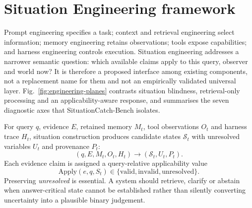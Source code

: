 \section*{Situation Engineering framework}

Prompt engineering specifies a task; context and retrieval engineering select
information; memory engineering retains observations; tools expose
capabilities; and harness engineering controls execution. Situation engineering
addresses a narrower semantic question: which available claims apply to this
query, observer and world now? It is therefore a proposed interface among
existing components, not a replacement name for them and not an empirically
validated universal layer. Fig.~\ref{fig:engineering-planes} contrasts
situation blindness, retrieval-only processing and an applicability-aware
response, and summarises the seven diagnostic axes that SituationCatch-Bench
isolates.

For query $q$, evidence $E$, retained memory $M_t$, tool observations $O_t$ and
harness trace $H_t$, situation construction produces candidate states
$\mathcal{S}_t$ with unresolved variables $U_t$ and provenance $P_t$:
\begin{equation}
(q,E,M_t,O_t,H_t)\rightarrow(\mathcal{S}_t,U_t,P_t).
\label{eq:contract}
\end{equation}
Each evidence claim is assigned a query-relative applicability value
\begin{equation}
\mathrm{Apply}(e,q,S_t)\in
\{\mathrm{valid},\mathrm{invalid},\mathrm{unresolved}\}.
\end{equation}
Preserving \emph{unresolved} is essential. A system should retrieve, clarify or
abstain when answer-critical state cannot be established rather than silently
converting uncertainty into a plausible binary judgement.

